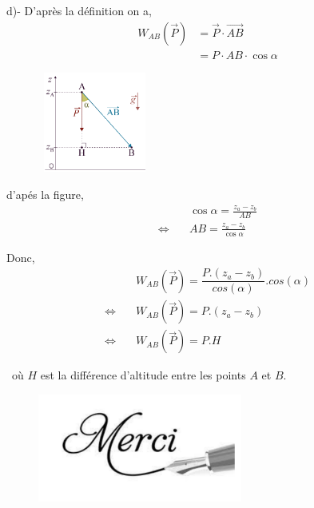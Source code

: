 \documentclass[10pt]{beamer}
\begin{document}
\begin{frame}
\begin{alertblock}{}
d)- D'après la définition on a, 
\begin{align*}
    W_{AB}(\overrightarrow{P}) &= \overrightarrow{P} \cdot \overrightarrow{AB} \\
    & = P \cdot AB \cdot \cos\alpha 
\end{align*}
\end{alertblock}

\begin{figure}[h]
\centering\
\includegraphics[width=0.3\textwidth]{figure4.png}
\end{figure}
\end{frame}

\begin{frame}
\begin{alertblock}{}
\noindent d'apés la figure,
\begin{align*}
 \quad & \cos\alpha = \frac{z_a-z_b}{AB} \\
\Longleftrightarrow \quad & AB = \frac{z_a-z_b}{\cos\alpha} 
\end{align*}

Donc, 
\begin{align*}
 \quad & W_{AB}(\overrightarrow{P}) =\dfrac{P.(z_a-z_b)}{cos(\alpha)}.cos(\alpha) \\
\Longleftrightarrow \quad & W_{AB}(\overrightarrow{P}) = P.(z_a-z_b) \\
\Longleftrightarrow \quad & \boxed{W_{AB}(\overrightarrow{P}) = P.H}
\end{align*}

\
où $H$ est la différence d'altitude entre les points $A$ et $B$.

\end{alertblock}
\end{frame}


\begin{frame}
\begin{figure}[h]
\centering
\includegraphics[width=0.6\textwidth]{merci.PNG} 
\end{figure}
\end{frame}
\end{document}
